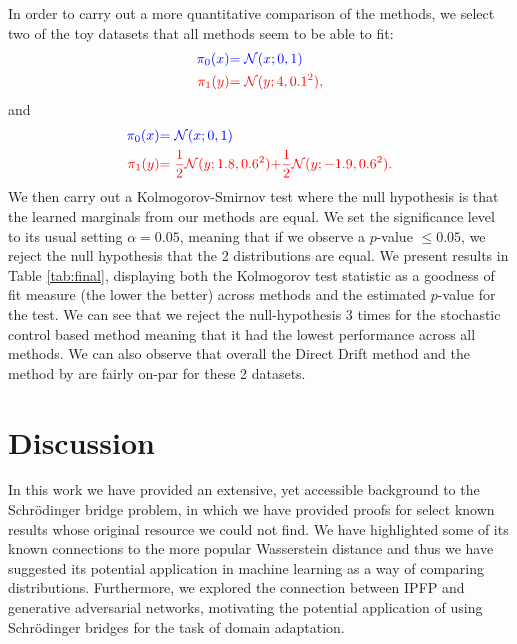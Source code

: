 \documentclass[a4paper,12pt,twoside,openright]{report}
\theoremstyle{definition}
\begin{document}
In order to carry out a more quantitative comparison of the methods, we select two of the toy datasets that all methods seem to be able to fit:
\begin{align*}
\color{blue}{\pi_0(x)} &\color{blue}{= {\mathcal{N}}(x; 0,  1)} \\
    \color{red}{\pi_1(y)} &\color{red}{= {\mathcal{N}}(y; 4, 0.1^2)} ,
\end{align*}
and
\begin{align*}
     \color{blue}{\pi_0(x)} &\color{blue}{= {\mathcal{N}}(x; 0,  1)} \\
    \color{red}{\pi_1(y)} &\color{red}{= \frac{1}{2}{\mathcal{N}}(y; 1.8, 0.6 ^2)}\color{red}{ + \frac{1}{2}{\mathcal{N}}(y; -1.9, 0.6 ^2) }.
\end{align*}
We then carry out a Kolmogorov-Smirnov \citep{kolmogorov1933sulla} test where the null hypothesis is that the learned marginals from our methods are equal. We set the significance level to its usual setting  $\alpha=0.05$, meaning that if we observe a $p$-value $\leq 0.05$, we reject the null hypothesis that the 2 distributions are equal. We present results in Table \ref{tab:final}, displaying both the Kolmogorov test statistic as a goodness of fit measure (the lower the better) across methods and the estimated $p$-value for the test. We can see that we reject the null-hypothesis 3 times for the stochastic control based method meaning that it had the lowest performance across all methods. We can also observe that overall the Direct Drift method and the method by \cite{pavon2018data} are fairly on-par for these 2 datasets.
\chapter{Discussion}

In this work we have provided an extensive, yet accessible background  to the Schrödinger bridge problem, in which we have provided proofs for select known results whose original resource we could not find. We have highlighted some of its known connections to the more popular Wasserstein distance and thus we have suggested its potential application in machine learning as a way of comparing distributions. Furthermore, we explored the connection between IPFP and generative adversarial networks, motivating the potential application of using Schrödinger bridges for the task of domain adaptation.
\end{document}
